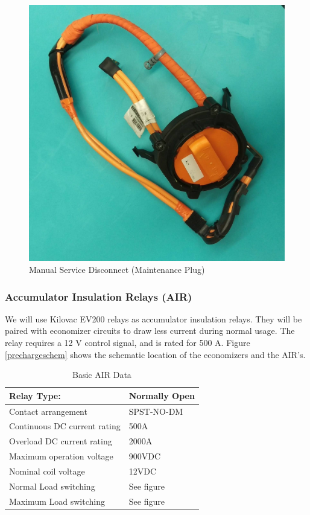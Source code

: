 \documentclass{article}
\begin{document}
            \begin{figure}[H]
                \centering
                \includegraphics[width = 0.5 \textwidth]{msd_highres}
                \caption{Manual Service Disconnect (Maintenance Plug)}
                \label{msd03}
            \end{figure}

        \subsubsection{Accumulator Insulation Relays (AIR)} \label{airs}


            We will use Kilovac EV200 relays as accumulator insulation relays. They will be paired with economizer circuits to draw less current during normal usage. The relay requires a 12 V control signal, and is rated for 500 A. Figure \ref{prechargeschem} shows the schematic location of the economizers and the AIR's.

            \begin{table}[H]
            \centering
            \begin{tabular}{|l|l|}
            \hline
            Relay Type: & Normally Open \\ \hline
            Contact arrangement & SPST-NO-DM \\ \hline
            Continuous DC current rating & 500A \\ \hline
            Overload DC current rating & 2000A \\ \hline
            Maximum operation voltage & 900VDC \\ \hline
            Nominal coil voltage & 12VDC \\ \hline
            Normal Load switching & See figure \\ \hline
            Maximum Load switching & See figure \\ \hline
            \end{tabular}
            \caption{Basic AIR Data}
            \label{air}
            \end{table}
\end{document}
